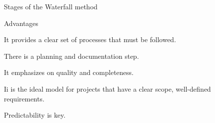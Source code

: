 \begin{frame}{Stages of the Waterfall method}    
    \begin{exampleblock}{Advantages}
        \item It provides a clear set of processes that must be followed.
        
        \item There is a planning and documentation step.
        
        \item It emphasizes on quality and completeness.
        
        \item Ii is the ideal model for projects that have a clear scope, well-defined requirements.
        
        \item Predictability is key.
     
    \end{exampleblock}

    \end{frame}
